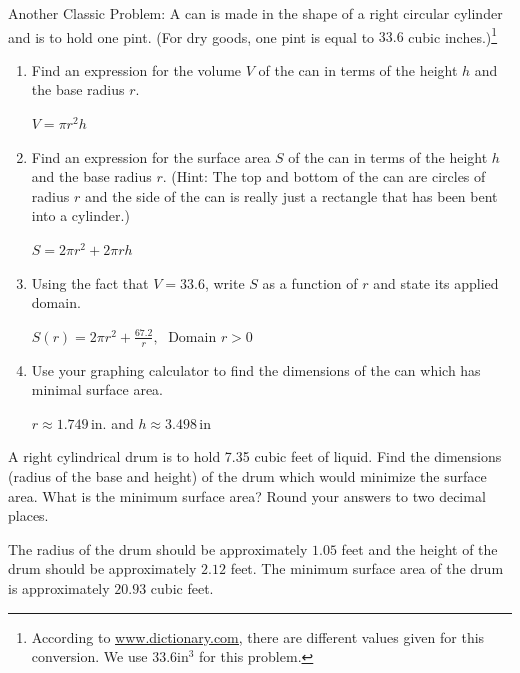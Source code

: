 \documentclass{ximera}
\begin{document}
\begin{problem}
Another Classic Problem: A can is made in the shape of a right circular cylinder and is to hold one pint. (For dry goods, one pint is equal to $33.6$ cubic inches.)\footnote{According to \href{http://dictionary.reference.com/browse/pint}{\underline{www.dictionary.com}}, there are different values given for this conversion. We use $33.6 \text{in}^{3}$ for this problem.}  

\begin{enumerate}

\item Find an expression for the volume $V$ of the can in terms of the height $h$ and the base radius $r$.

\begin{solution}
    $V = \pi r^{2}h$
\end{solution}

\item Find an expression for the surface area $S$ of the can in terms of the height $h$ and the base radius $r$.  (Hint: The top and bottom of the can are circles of radius $r$ and the side of the can is really just a rectangle that has been bent into a cylinder.)

\begin{solution}
    $S = 2 \pi r^{2} + 2\pi r h$
\end{solution}

\item Using the fact that $V = 33.6$, write $S$ as a function of $r$ and state its applied domain.

\begin{solution}
    $S(r) = 2\pi r^{2} + \frac{67.2}{r}, \;$  Domain $r > 0$
\end{solution}

\item Use your graphing calculator to find the dimensions of the can which has minimal surface area.

\begin{solution}
    $r \approx 1.749\,$in. and $h \approx 3.498\,$in
\end{solution}

\end{enumerate}
\end{problem}

\begin{problem}
A right cylindrical drum is to hold 7.35 cubic feet of liquid.  Find the dimensions (radius of the base and height) of the drum which would minimize the surface area.  What is the minimum surface area?  Round your answers to two decimal places.

\begin{solution}
    The radius of the drum should be approximately $1.05$ feet and the height of the drum should be approximately  $2.12$ feet.  The minimum surface area of the drum is approximately $20.93$ cubic feet.
\end{solution}

\end{problem} 
\end{document}
